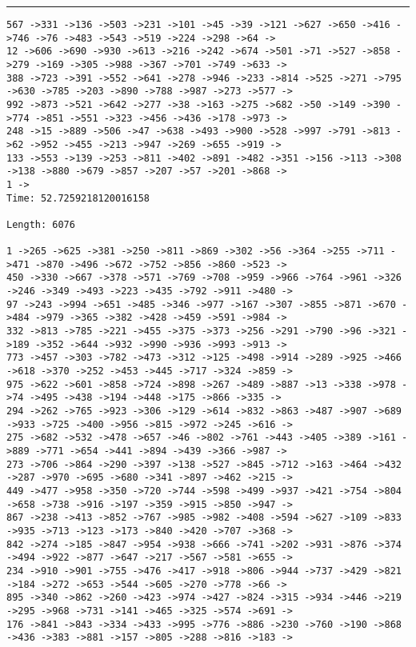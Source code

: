 \documentclass[letter, 12pt]{article}
\newenvironment{question}[1]{%
    \vspace{.2in}%
        \noindent{\bf #1}%
    \vspace{0.3em} \hrule \vspace{.1in}%
}{}
\begin{document}
\begin{question}{\large Appendix}
\begin{lstlisting}[style=CStyle]
567 ->331 ->136 ->503 ->231 ->101 ->45 ->39 ->121 ->627 ->650 ->416 ->746 ->76 ->483 ->543 ->519 ->224 ->298 ->64 ->
12 ->606 ->690 ->930 ->613 ->216 ->242 ->674 ->501 ->71 ->527 ->858 ->279 ->169 ->305 ->988 ->367 ->701 ->749 ->633 ->
388 ->723 ->391 ->552 ->641 ->278 ->946 ->233 ->814 ->525 ->271 ->795 ->630 ->785 ->203 ->890 ->788 ->987 ->273 ->577 ->
992 ->873 ->521 ->642 ->277 ->38 ->163 ->275 ->682 ->50 ->149 ->390 ->774 ->851 ->551 ->323 ->456 ->436 ->178 ->973 ->
248 ->15 ->889 ->506 ->47 ->638 ->493 ->900 ->528 ->997 ->791 ->813 ->62 ->952 ->455 ->213 ->947 ->269 ->655 ->919 ->
133 ->553 ->139 ->253 ->811 ->402 ->891 ->482 ->351 ->156 ->113 ->308 ->138 ->880 ->679 ->857 ->207 ->57 ->201 ->868 ->
1 ->
Time: 52.7259218120016158

Length: 6076

1 ->265 ->625 ->381 ->250 ->811 ->869 ->302 ->56 ->364 ->255 ->711 ->471 ->870 ->496 ->672 ->752 ->856 ->860 ->523 ->
450 ->330 ->667 ->378 ->571 ->769 ->708 ->959 ->966 ->764 ->961 ->326 ->246 ->349 ->493 ->223 ->435 ->792 ->911 ->480 ->
97 ->243 ->994 ->651 ->485 ->346 ->977 ->167 ->307 ->855 ->871 ->670 ->484 ->979 ->365 ->382 ->428 ->459 ->591 ->984 ->
332 ->813 ->785 ->221 ->455 ->375 ->373 ->256 ->291 ->790 ->96 ->321 ->189 ->352 ->644 ->932 ->990 ->936 ->993 ->913 ->
773 ->457 ->303 ->782 ->473 ->312 ->125 ->498 ->914 ->289 ->925 ->466 ->618 ->370 ->252 ->453 ->445 ->717 ->324 ->859 ->
975 ->622 ->601 ->858 ->724 ->898 ->267 ->489 ->887 ->13 ->338 ->978 ->74 ->495 ->438 ->194 ->448 ->175 ->866 ->335 ->
294 ->262 ->765 ->923 ->306 ->129 ->614 ->832 ->863 ->487 ->907 ->689 ->933 ->725 ->400 ->956 ->815 ->972 ->245 ->616 ->
275 ->682 ->532 ->478 ->657 ->46 ->802 ->761 ->443 ->405 ->389 ->161 ->889 ->771 ->654 ->441 ->894 ->439 ->366 ->987 ->
273 ->706 ->864 ->290 ->397 ->138 ->527 ->845 ->712 ->163 ->464 ->432 ->287 ->970 ->695 ->680 ->341 ->897 ->462 ->215 ->
449 ->477 ->958 ->350 ->720 ->744 ->598 ->499 ->937 ->421 ->754 ->804 ->658 ->738 ->916 ->197 ->359 ->915 ->850 ->947 ->
867 ->238 ->413 ->852 ->767 ->985 ->982 ->408 ->594 ->627 ->109 ->833 ->935 ->713 ->123 ->173 ->840 ->420 ->707 ->368 ->
842 ->274 ->185 ->847 ->954 ->938 ->666 ->741 ->202 ->931 ->876 ->374 ->494 ->922 ->877 ->647 ->217 ->567 ->581 ->655 ->
234 ->910 ->901 ->755 ->476 ->417 ->918 ->806 ->944 ->737 ->429 ->821 ->184 ->272 ->653 ->544 ->605 ->270 ->778 ->66 ->
895 ->340 ->862 ->260 ->423 ->974 ->427 ->824 ->315 ->934 ->446 ->219 ->295 ->968 ->731 ->141 ->465 ->325 ->574 ->691 ->
176 ->841 ->843 ->334 ->433 ->995 ->776 ->886 ->230 ->760 ->190 ->868 ->436 ->383 ->881 ->157 ->805 ->288 ->816 ->183 ->

\end{lstlisting}
\end{question}
\end{document}
